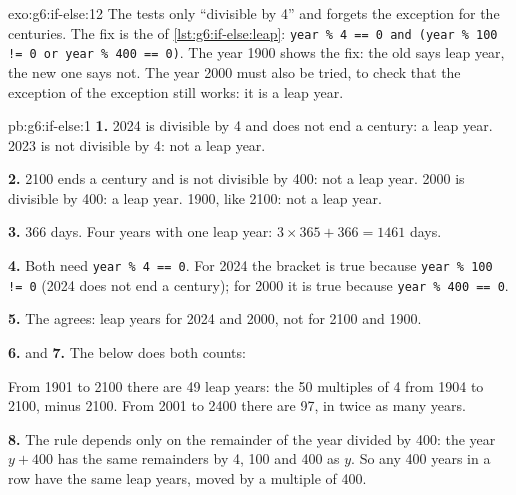 \begin{solution}{exo:g6:if-else:12}
The  tests only ``divisible by 4'' and forgets the exception for the
centuries. The fix is the  of \cref{lst:g6:if-else:leap}:
\texttt{year \% 4 == 0 and (year \% 100 != 0 or year \% 400 == 0)}. The year 1900
shows the fix: the old  says leap year, the new one says not. The year
2000 must also be tried, to check that the exception of the exception still
works: it is a leap year.
\end{solution}

\begin{solution}{pb:g6:if-else:1}
\textbf{1.} 2024 is divisible by 4 and does not end a century: a leap year.
2023 is not divisible by 4: not a leap year.

\textbf{2.} 2100 ends a century and is not divisible by 400: not a leap year.
2000 is divisible by 400: a leap year. 1900, like 2100: not a leap year.

\textbf{3.} 366 days. Four years with one leap year: $3 \times 365 + 366 =
1461$ days.

\textbf{4.} Both need \texttt{year \% 4 == 0}. For 2024 the bracket is true
because \texttt{year \% 100 != 0} (2024 does not end a century); for 2000 it is
true because \texttt{year \% 400 == 0}.

\textbf{5.} The  agrees: leap years for 2024 and 2000, not for 2100
and 1900.

\textbf{6.} and \textbf{7.} The  below does both counts:

\label{lst:g6:if-else:count-leap}

\label{out:g6:if-else:count-leap}

From 1901 to 2100 there are 49 leap years: the 50 multiples of 4 from 1904 to
2100, minus 2100. From 2001 to 2400 there are 97, in twice as many years.

\textbf{8.} The rule depends only on the remainder of the year divided by 400:
the year $y + 400$ has the same remainders by 4, 100 and 400 as $y$. So any 400
years in a row have the same leap years, moved by a multiple of 400.


\end{solution}
